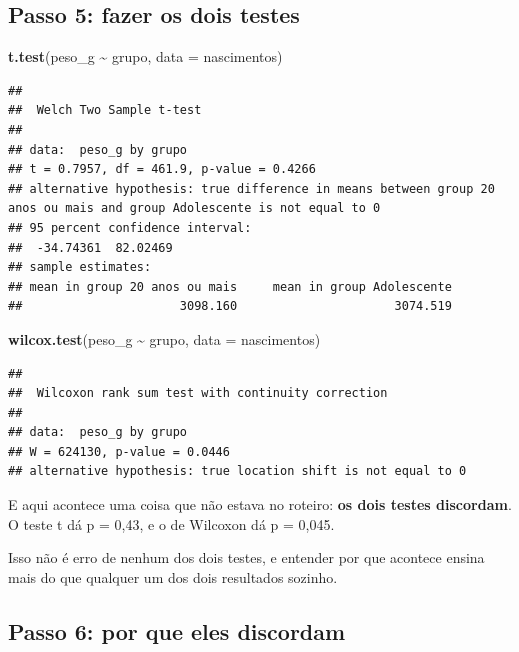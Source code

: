 \documentclass[
]{book}
\newenvironment{Shaded}{\begin{snugshade}}{\end{snugshade}}
\newcommand{\AttributeTok}[1]{\textcolor[rgb]{0.13,0.29,0.53}{#1}}
\newcommand{\FunctionTok}[1]{\textcolor[rgb]{0.13,0.29,0.53}{\textbf{#1}}}
\newcommand{\NormalTok}[1]{#1}
\newcommand{\SpecialCharTok}[1]{\textcolor[rgb]{0.81,0.36,0.00}{\textbf{#1}}}
\begin{document}
\subsection{Passo 5: fazer os dois testes}\label{passo-5-fazer-os-dois-testes}

\begin{Shaded}
\begin{Highlighting}[]
\FunctionTok{t.test}\NormalTok{(peso\_g }\SpecialCharTok{\textasciitilde{}}\NormalTok{ grupo, }\AttributeTok{data =}\NormalTok{ nascimentos)}
\end{Highlighting}
\end{Shaded}

\begin{verbatim}
## 
##  Welch Two Sample t-test
## 
## data:  peso_g by grupo
## t = 0.7957, df = 461.9, p-value = 0.4266
## alternative hypothesis: true difference in means between group 20 anos ou mais and group Adolescente is not equal to 0
## 95 percent confidence interval:
##  -34.74361  82.02469
## sample estimates:
## mean in group 20 anos ou mais     mean in group Adolescente 
##                      3098.160                      3074.519
\end{verbatim}

\begin{Shaded}
\begin{Highlighting}[]
\FunctionTok{wilcox.test}\NormalTok{(peso\_g }\SpecialCharTok{\textasciitilde{}}\NormalTok{ grupo, }\AttributeTok{data =}\NormalTok{ nascimentos)}
\end{Highlighting}
\end{Shaded}

\begin{verbatim}
## 
##  Wilcoxon rank sum test with continuity correction
## 
## data:  peso_g by grupo
## W = 624130, p-value = 0.0446
## alternative hypothesis: true location shift is not equal to 0
\end{verbatim}

E aqui acontece uma coisa que não estava no roteiro: \textbf{os dois testes discordam}. O teste t dá p = 0,43, e o de Wilcoxon dá p = 0,045.

Isso não é erro de nenhum dos dois testes, e entender por que acontece ensina mais do que qualquer um dos dois resultados sozinho.

\subsection{Passo 6: por que eles discordam}\label{passo-6-por-que-eles-discordam}
\end{document}
